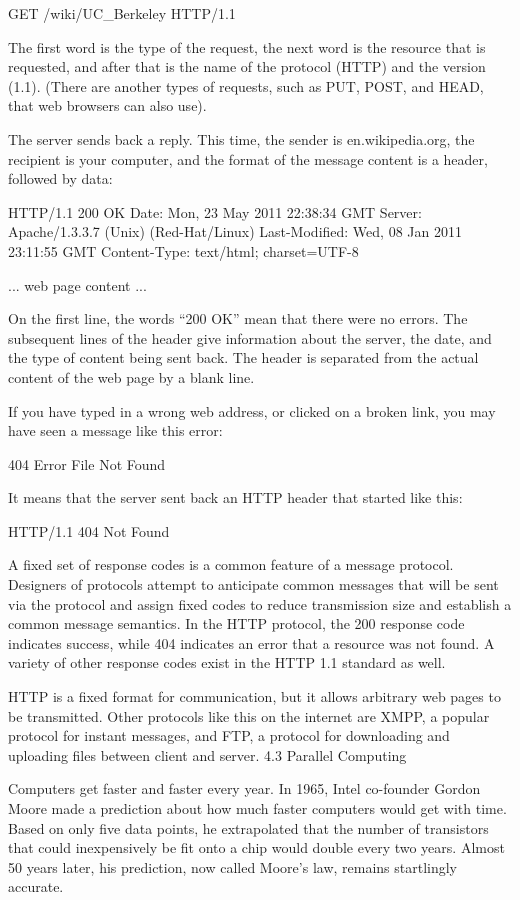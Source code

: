 \documentclass[letterpaper,10pt,dvipdfmx]{sphinxmanual}
\begin{document}
GET /wiki/UC\_Berkeley HTTP/1.1

The first word is the type of the request, the next word is the resource that is requested, and after that is the name of the protocol (HTTP) and the version (1.1). (There are another types of requests, such as PUT, POST, and HEAD, that web browsers can also use).

The server sends back a reply. This time, the sender is en.wikipedia.org, the recipient is your computer, and the format of the message content is a header, followed by data:

HTTP/1.1 200 OK
Date: Mon, 23 May 2011 22:38:34 GMT
Server: Apache/1.3.3.7 (Unix) (Red-Hat/Linux)
Last-Modified: Wed, 08 Jan 2011 23:11:55 GMT
Content-Type: text/html; charset=UTF-8

... web page content ...

On the first line, the words ``200 OK'' mean that there were no errors. The subsequent lines of the header give information about the server, the date, and the type of content being sent back. The header is separated from the actual content of the web page by a blank line.

If you have typed in a wrong web address, or clicked on a broken link, you may have seen a message like this error:

404 Error File Not Found

It means that the server sent back an HTTP header that started like this:

HTTP/1.1 404 Not Found

A fixed set of response codes is a common feature of a message protocol. Designers of protocols attempt to anticipate common messages that will be sent via the protocol and assign fixed codes to reduce transmission size and establish a common message semantics. In the HTTP protocol, the 200 response code indicates success, while 404 indicates an error that a resource was not found. A variety of other response codes exist in the HTTP 1.1 standard as well.

HTTP is a fixed format for communication, but it allows arbitrary web pages to be transmitted. Other protocols like this on the internet are XMPP, a popular protocol for instant messages, and FTP, a protocol for downloading and uploading files between client and server.
4.3   Parallel Computing

Computers get faster and faster every year. In 1965, Intel co-founder Gordon Moore made a prediction about how much faster computers would get with time. Based on only five data points, he extrapolated that the number of transistors that could inexpensively be fit onto a chip would double every two years. Almost 50 years later, his prediction, now called Moore's law, remains startlingly accurate.
\end{document}
